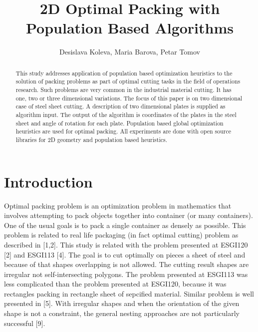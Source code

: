 \documentclass{llncs}
\begin{document}
\pagestyle{headings} 
\mainmatter
%
\title{2D Optimal Packing with Population Based Algorithms}
%
\author{Desislava Koleva, Maria Barova, Petar Tomov}
%
%
%
%
%
\maketitle
%
\begin{abstract}
This study addresses application of population based optimization heuristics to the solution of packing problems as part of optimal cutting tasks in the field of operations research. Such problems are very common in the industrial material cutting. It has one, two or three dimensional variations. The focus of this paper is on two dimensional case of steel sheet cutting. A description of two dimensional plates is supplied as algorithm input. The output of the algorithm is coordinates of the plates in the steel sheet and angle of rotation for each plate. Population based global optimization heuristics are used for optimal packing. All experiments are done with open source libraries for 2D geometry and population based heuristics. 
\end{abstract}
%
\section{Introduction}
%
Optimal packing problem is an optimization problem in mathematics that involves attempting to pack objects together into container (or many containers). One of the usual goals is to pack a single container as densely as possible. This problem is related to real life packaging (in fact optimal cutting) problem as described in [1,2]. This study is related with the problem presented at ESGI120 [2] and ESGI113 [4]. The goal is to cut optimally on pieces a sheet of steel and because of that shapes overlapping is not allowed. The cutting result shapes are irregular not self-intersecting polygons. The problem presented at ESGI113 was less complicated than the problem presented at ESGI120, because it was rectangles packing in rectangle sheet of sepcified material. Similar problem is well presented in [5]. With irregular shapes and when the orientation of the given shape is not a constraint, the general nesting approaches are not particularly successful [9]. 
\end{document}
